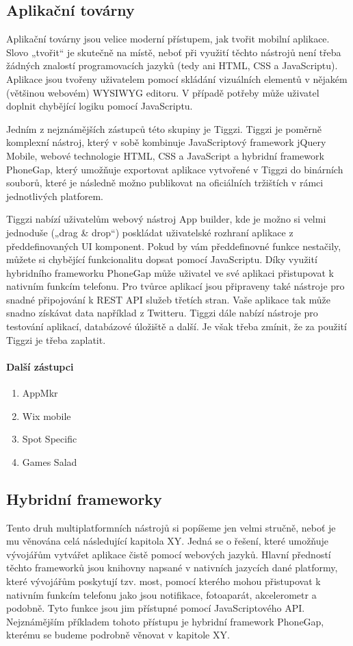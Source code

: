 \subsection{Aplikační továrny}
Aplikační továrny jsou velice moderní přístupem, jak tvořit mobilní aplikace. Slovo „tvořit“ je skutečně na místě, neboť při využití těchto nástrojů není třeba žádných znalostí programovacích jazyků (tedy ani HTML, CSS a JavaScriptu). Aplikace jsou tvořeny uživatelem pomocí skládání vizuálních elementů v nějakém (většinou webovém) WYSIWYG editoru. V případě potřeby může uživatel doplnit chybějící logiku pomocí JavaScriptu.

Jedním z nejznámějších zástupců této skupiny je Tiggzi. Tiggzi je poměrně komplexní nástroj, který v sobě kombinuje JavaScriptový framework jQuery Mobile, webové technologie HTML, CSS a JavaScript a hybridní framework PhoneGap, který umožňuje exportovat aplikace vytvořené v Tiggzi do binárních souborů, které je následně možno publikovat na oficiálních tržištích v rámci jednotlivých platforem.

Tiggzi nabízí uživatelům webový nástroj App builder, kde je možno si velmi jednoduše („drag \& drop“) poskládat uživatelské rozhraní aplikace z předdefinovaných UI komponent. Pokud by vám předdefinovné funkce nestačily, můžete si chybějící funkcionalitu dopsat pomocí JavaScriptu. Díky využití hybridního frameworku PhoneGap může uživatel ve své aplikaci přistupovat k nativním funkcím telefonu. Pro tvůrce aplikací jsou připraveny také nástroje pro snadné připojování k REST API služeb třetích stran. Vaše aplikace tak může snadno získávat data například z Twitteru. Tiggzi dále nabízí nástroje pro testování aplikací, databázové úložiště a další. Je však třeba zmínit, že za použití Tiggzi je třeba zaplatit.

\paragraph{Další zástupci}
\begin{enumerate}
	\item AppMkr
	\item Wix mobile
	\item Spot Specific
	\item Games Salad
\end{enumerate}

\subsection{Hybridní frameworky}
Tento druh multiplatformních nástrojů si popíšeme jen velmi stručně, neboť je mu věnována celá následující kapitola XY. Jedná se o řešení, které umožňuje vývojářům vytvářet aplikace čistě pomocí webových jazyků. Hlavní předností těchto frameworků jsou knihovny napsané v nativních jazycích dané platformy, které vývojářům poskytují tzv. most, pomocí kterého mohou přistupovat k nativním funkcím telefonu jako jsou notifikace, fotoaparát, akcelerometr a podobně. Tyto funkce jsou jim přístupné pomocí JavaScriptového API.
Nejznámějším příkladem tohoto přístupu je hybridní framework PhoneGap, kterému se budeme podrobně věnovat v kapitole XY.

